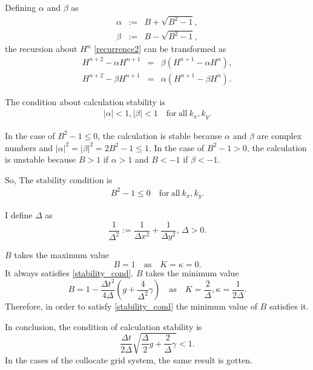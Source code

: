\documentclass[a4paper,11pt]{article}
\newcommand{\as}{\quad\mathrm{as}\quad}
\begin{document}
Defining $\alpha$ and $\beta$ as
\begin{eqnarray}
\alpha &:=& B + \sqrt{B^2-1} \label{solution_alpha},\\
\beta  &:=& B - \sqrt{B^2-1} \label{solution_beta},
\end{eqnarray}
the recursion about $H^n$ \eqref{recurrence2} can be transformed as
\begin{eqnarray}
H^{n+2} - \alpha H^{n+1} &=& \beta  (H^{n+1} - \alpha H^{n}), \\
H^{n+2} - \beta  H^{n+1} &=& \alpha (H^{n+1} - \beta  H^{n}).
\end{eqnarray}

The condition about calculation stability is
\begin{eqnarray}
|\alpha| < 1, |\beta| < 1
\quad\mathrm{for}\ \mathrm{all}\ k_x, k_y.
\end{eqnarray}

In the case of $B^2 - 1 \leq 0$, the calculation is stable because $\alpha$ and $\beta$ are complex numbers and
$
|\alpha|^2 = |\beta|^2 = 2B^2 - 1 \leq 1.
$
In the case of $B^2 - 1 > 0$, the calculation is unstable because
$B > 1$ if $\alpha > 1$ and $B < -1$ if $\beta < -1$.

So, The stability condition is
\begin{eqnarray}
B^2 - 1 \leq 0
\quad\mathrm{for}\ \mathrm{all}\ k_x, k_y. \label{stability_cond}
\end{eqnarray}

I define $\Delta$ as
\begin{equation}
\frac{1}{\Delta^2} := \frac{1}{\Delta x^2} + \frac{1}{\Delta y^2}, \, \Delta
 > 0.
\end{equation}

$B$ takes the maximum value
\begin{equation}
B=1 \as K = \kappa = 0.
\end{equation}
It always satisfies \eqref{stability_cond}. $B$ takes the minimum value
\begin{equation}
B= 1 - \frac{\Delta t^2}{4 \Delta} \left(g + \frac{4}{\Delta^2}\gamma\right)
\as K = \frac{2}{\Delta}, \kappa = \frac{1}{2\Delta}.
\end{equation}
Therefore, in order to satisfy \eqref{stability_cond} the minimum value of $B$ satisfies it.

In conclusion, the condition of calculation stability is
\begin{equation}
\frac{\Delta t}{2\Delta}\sqrt{\frac{\Delta}{2}g +
\frac{2}{\Delta}\gamma} < 1. \label{waveCFL}
\end{equation}
In the cases of the collocate grid system, the same result is gotten.
\end{document}
